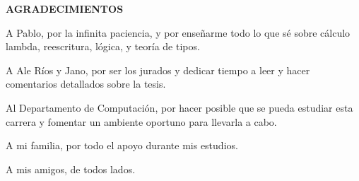 \begin{center}
  \textbf{AGRADECIMIENTOS}
\end{center}

A Pablo, por la infinita paciencia, y por enseñarme todo lo que sé sobre cálculo lambda, reescritura, lógica, y teoría de tipos.

A Ale Ríos y Jano, por ser los jurados y dedicar tiempo a leer y hacer comentarios detallados sobre la tesis.

Al Departamento de Computación, por hacer posible que se pueda estudiar esta carrera y fomentar un ambiente oportuno para llevarla a cabo.

A mi familia, por todo el apoyo durante mis estudios.

A mis amigos, de todos lados.
